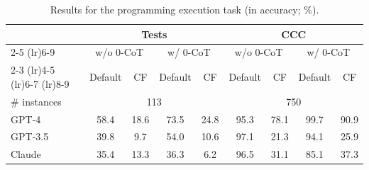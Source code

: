 

\begin{table}[t!]
    \centering
    \begin{tabular}{lcccccccc}
        \toprule
        & \multicolumn{4}{c}{Tests} & \multicolumn{4}{c}{CCC} \\
        \cmidrule(lr){2-5}
        \cmidrule(lr){6-9}
        & \multicolumn{2}{c}{w/o 0-CoT} & \multicolumn{2}{c}{w/ 0-CoT} & \multicolumn{2}{c}{w/o 0-CoT} & \multicolumn{2}{c}{w/ 0-CoT} \\
        \cmidrule(lr){2-3}
        \cmidrule(lr){4-5}
        \cmidrule(lr){6-7}
        \cmidrule(lr){8-9} 
        & Default & CF & Default & CF & Default & CF & Default & CF \\
        \midrule
        \# instances & \multicolumn{4}{c}{113} & \multicolumn{4}{c}{750} \\
        \midrule
        GPT-4 & 58.4 & 18.6 & 73.5 & 24.8 & 95.3 & 78.1 & 99.7 & 90.9 \\
        GPT-3.5 & 39.8 & \phantom{0}9.7 & 54.0 & 10.6 & 97.1 & 21.3 & 94.1 & 25.9 \\
        Claude & 35.4 & 13.3 & 36.3 & \phantom{0}6.2 & 96.5 & 31.1 & 85.1 & 37.3 \\
        \bottomrule
    \end{tabular}
    \caption{
    Results for the programming execution task (in accuracy; \%).
    }
\end{table}

